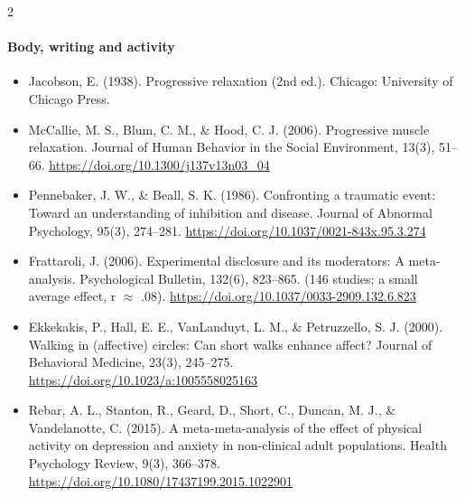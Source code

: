 \documentclass[10pt]{article}
\theoremstyle{definition}
\theoremstyle{remark}
\begin{document}
\begin{multicols}{2}
\paragraph{Body, writing and activity}
\begin{itemize}[leftmargin=1em,itemsep=0pt,topsep=1pt,parsep=0pt]
\item Jacobson, E. (1938). Progressive relaxation (2nd ed.). Chicago: University of Chicago Press.
\item McCallie, M. S., Blum, C. M., \& Hood, C. J. (2006). Progressive muscle relaxation. Journal of Human Behavior in the Social Environment, 13(3), 51--66. \url{https://doi.org/10.1300/j137v13n03_04}
\item Pennebaker, J. W., \& Beall, S. K. (1986). Confronting a traumatic event: Toward an understanding of inhibition and disease. Journal of Abnormal Psychology, 95(3), 274--281. \url{https://doi.org/10.1037/0021-843x.95.3.274}
\item Frattaroli, J. (2006). Experimental disclosure and its moderators: A meta-analysis. Psychological Bulletin, 132(6), 823--865. (146 studies; a small average effect, r $\approx$ .08). \url{https://doi.org/10.1037/0033-2909.132.6.823}
\item Ekkekakis, P., Hall, E. E., VanLanduyt, L. M., \& Petruzzello, S. J. (2000). Walking in (affective) circles: Can short walks enhance affect? Journal of Behavioral Medicine, 23(3), 245--275. \url{https://doi.org/10.1023/a:1005558025163}
\item Rebar, A. L., Stanton, R., Geard, D., Short, C., Duncan, M. J., \& Vandelanotte, C. (2015). A meta-meta-analysis of the effect of physical activity on depression and anxiety in non-clinical adult populations. Health Psychology Review, 9(3), 366--378. \url{https://doi.org/10.1080/17437199.2015.1022901}
\end{itemize}

\end{multicols}
\end{document}
